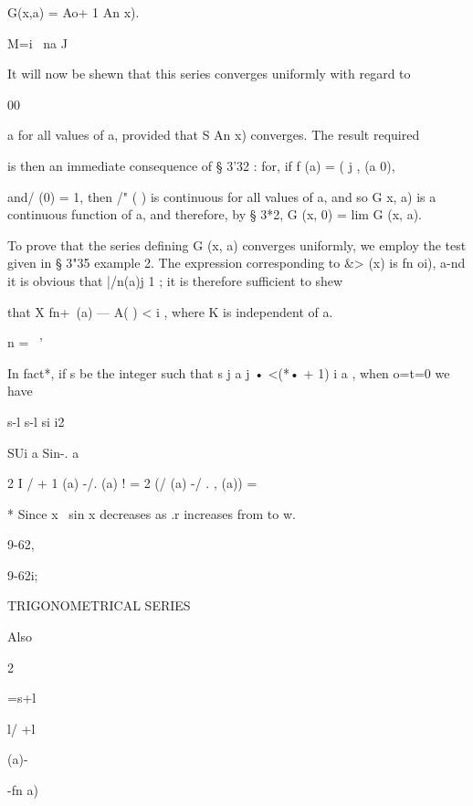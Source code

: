 G(x,a) = Ao+ 1 An x). 

M=i \ na J 

It will now be shewn that this series converges uniformly with regard to 

00 

a for all values of a, provided that S An x) converges. The result required 

is then an immediate consequence of § 3'32 : for, if f  (a) = (   j , (a   0), 

and/  (0) = 1, then /" ( ) is continuous for all values of a, and so G x, a) is a 
continuous function of a, and therefore, by § 3*2, G (x, 0) = lim G (x, a). 

To prove that the series defining G (x, a) converges uniformly, we employ 
the test given in § 3"35 example 2. The expression corresponding to \&>  (x) 
is fn oi), a-nd it is obvious that |/n(a)j  1 ; it is therefore sufficient to shew 

that X fn+\ (a) — A( ) < i , where K is independent of a. 

n = \ ' 

In fact*, if s be the integer such that s j a j    • <(*• + 1) i a , when o=t=0 we have 



s-l s-l si i2 



SUi  a Sin-. a 



2 I /  + 1 (a) -/. (a) ! = 2 (/  (a) -/   . , (a)) =   

* Since x~  sin x decreases as .r increases from to w. 



9-62, 


9-62i; 






TRIGONOMETRICAL SERIES 




Also 
















2 

=s+l 


l/ +l 


(a)- 


-fn a) 


